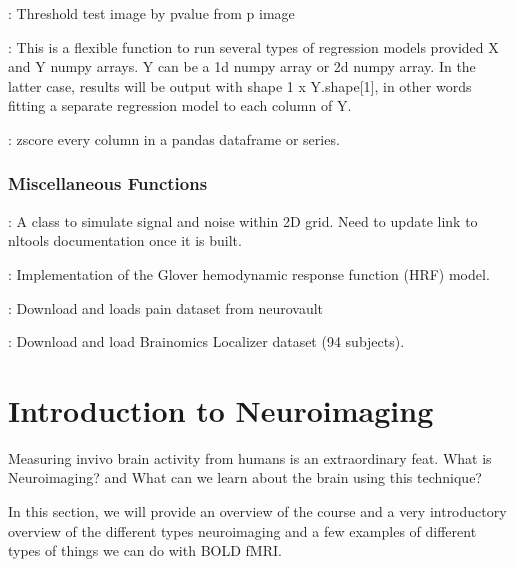 \documentclass[letterpaper,10pt,english]{sphinxmanual}
\begin{document}
: Threshold test image by p\sphinxhyphen{}value from p image

: This is a flexible function to run several types of regression models provided X and Y numpy arrays. Y can be a 1d numpy array or 2d numpy array. In the latter case, results will be output with shape 1 x Y.shape{[}1{]}, in other words fitting a separate regression model to each column of Y.

: zscore every column in a pandas dataframe or series.


\subsubsection{Miscellaneous Functions}
\label{\detokenize{content/Glossary:miscellaneous-functions}}
: A class to simulate signal and noise within 2D grid. Need to update link to nltools documentation once it is built.

: Implementation of the Glover hemodynamic response function (HRF) model.

: Download and loads pain dataset from neurovault

: Download and load Brainomics Localizer dataset (94 subjects).


\section{Introduction to Neuroimaging}
\label{\detokenize{content/Intro_to_Neuroimaging:introduction-to-neuroimaging}}\label{\detokenize{content/Intro_to_Neuroimaging::doc}}
Measuring in\sphinxhyphen{}vivo brain activity from humans is an extraordinary feat. What is Neuroimaging? and What can we learn about the brain using this technique?

In this section, we will provide an overview of the course and a very introductory overview of the different types neuroimaging and a few examples of different types of things we can do with BOLD fMRI.
\end{document}
